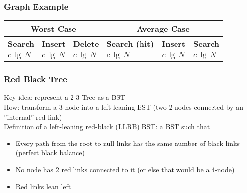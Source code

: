 \documentclass[a4paper]{article}
\begin{document}
\subsubsection*{Graph Example}
\begin{center}
\end{center}

\begin{spacing}{1.5}
\begin{tabularx}{1\textwidth}{|X|X|X|X|X|X|}
    \hline
    \multicolumn{3}{|c|}{\textbf{Worst Case}} &\multicolumn{3}{c|}{\textbf{Average Case}}\\
    \hline
    \textbf{Search} & \textbf{Insert} & \textbf{Delete} & \textbf{Search (hit)} & \textbf{Insert} & \textbf{Search}\\
    \hline
    $c\,\lg\,N$&$c\,\lg\,N$&$c\,\lg\,N$&$c\,\lg\,N$&$c\,\lg\,N$&$c\,\lg\,N$\\
    \hline
\end{tabularx}
\end{spacing}

\subsubsection*{Red Black Tree}
Key idea: represent a 2-3 Tree as a BST\\
How: transform a 3-node into a left-leaning BST (two 2-nodes connected by an ”internal” red link)\\
\newline
Definition of a left-leaning red-black (LLRB) BST: a BST such that
\begin{itemize}
    \item Every path from the root to null links has the same number of black links (perfect black balance)
    \item No node has 2 red links connected to it (or else that would be a 4-node)
    \item Red links lean left
\end{itemize}
\end{document}
